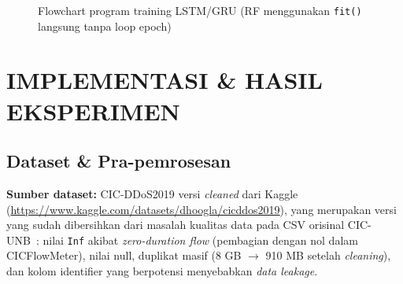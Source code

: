\documentclass[11pt,a4paper,oneside]{report}
\begin{document}
\begin{figure}[h!]
\centering
{}
\caption{Flowchart program training LSTM/GRU (RF menggunakan \texttt{fit()} langsung tanpa loop epoch)}
\label{fig:flowchart}
\end{figure}

\chapter{IMPLEMENTASI \& HASIL EKSPERIMEN}
\label{bab:implementasi}

\section{Dataset \& Pra-pemrosesan}

\textbf{Sumber dataset:} CIC-DDoS2019 versi \textit{cleaned} dari Kaggle (\url{https://www.kaggle.com/datasets/dhoogla/cicddos2019}), yang merupakan versi yang sudah dibersihkan dari masalah kualitas data pada CSV orisinal CIC-UNB~\cite{sharafaldin2019}: nilai \texttt{Inf} akibat \textit{zero-duration flow} (pembagian dengan nol dalam CICFlowMeter), nilai null, duplikat masif (8 GB $\to$ 910 MB setelah \textit{cleaning}), dan kolom identifier yang berpotensi menyebabkan \textit{data leakage}.
\end{document}
